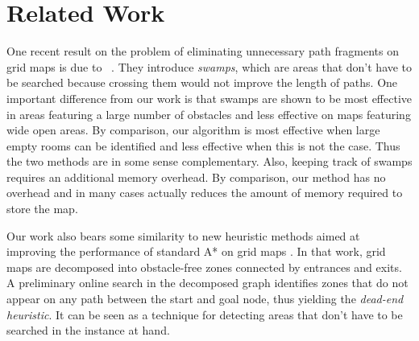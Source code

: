 \section{Related Work}
One recent result on the problem of eliminating unnecessary path fragments on grid maps is due to
\citeauthor{pochter09}~.
They introduce \emph{swamps}, which are areas that don't have to be searched
because crossing them would not improve the length of paths.
One important difference from our work is that swamps are shown to be most effective in areas featuring a
large number of obstacles and less effective on maps featuring wide open areas.
By comparison, our algorithm is most effective when large empty rooms can be identified and less
effective when this is not the case.
Thus the two methods are in some sense complementary.
Also, keeping track of swamps requires an additional memory overhead.
By comparison, our method has no overhead and in many cases actually reduces the amount of
memory required to store the map.
\par
Our work also bears some similarity to new heuristic methods aimed at improving the 
performance of standard A* on grid maps \cite{bjornsson06}.
In that work, grid maps are decomposed into obstacle-free zones connected by entrances 
and exits.
A preliminary online search in the decomposed graph identifies zones that do not appear 
on any path between the start and goal node, thus yielding the \emph{dead-end heuristic}.
It can be seen as a technique for detecting areas that don't have to be searched
in the instance at hand.
